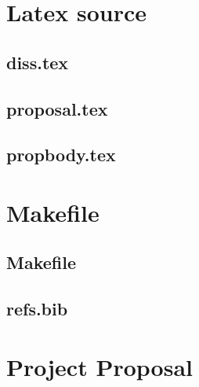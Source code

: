 \documentclass[12pt,twoside,notitlepage]{report}
\begin{document}


\cleardoublepage

\appendix

\chapter{Latex source}

\section{diss.tex}
{\scriptsize}

\section{proposal.tex}
{\scriptsize}

\section{propbody.tex}
{\scriptsize}



\cleardoublepage

\chapter{Makefile}

\section{\label{makefile}Makefile}
{\scriptsize}

\section{refs.bib}
{\scriptsize}


\cleardoublepage

\chapter{Project Proposal}


\end{document}
